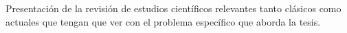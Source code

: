 Presentación de la revisión de estudios científicos relevantes tanto clásicos como actuales que tengan que ver con el problema específico que aborda la tesis. 
